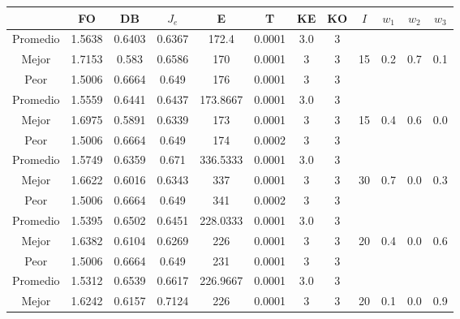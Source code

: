 \begin{table}[h!]
    \footnotesize
    \begin{center}
        \begin{tabular}{|c|c|c|c|c|c|c|c|c|c|c|c|}
        \hline
            & {\bf FO} & {\bf DB} & $J_e$ & {\bf E} & {\bf T} & {\bf KE} & {\bf KO} & $I$ & $w_1$ & $w_2$ & $w_3$ \\
        \hline
        \hline
            Promedio  & 1.5638 & 0.6403 & 0.6367 & 172.4 & 0.0001 & 3.0 & 3 &  &  &  & \\
            \cline{1-8}
            Mejor & 1.7153 & 0.583  & 0.6586 & 170 & 0.0001 & 3 & 3 & 15 & 0.2 & 0.7 & 0.1\\
            \cline{1-8}
            Peor & 1.5006 & 0.6664  & 0.649 & 176 & 0.0001 & 3 & 3 &  &  &  & \\
        \hline
        \hline
            Promedio  & 1.5559 & 0.6441 & 0.6437 & 173.8667 & 0.0001 & 3.0 & 3 &  &  &  & \\
            \cline{1-8}
            Mejor & 1.6975 & 0.5891  & 0.6339 & 173 & 0.0001 & 3 & 3 & 15 & 0.4 & 0.6 & 0.0\\
            \cline{1-8}
            Peor & 1.5006 & 0.6664  & 0.649 & 174 & 0.0002 & 3 & 3 &  &  &  & \\
        \hline
        \hline
            Promedio  & 1.5749 & 0.6359 & 0.671 & 336.5333 & 0.0001 & 3.0 & 3 &  &  &  & \\
            \cline{1-8}
            Mejor & 1.6622 & 0.6016  & 0.6343 & 337 & 0.0001 & 3 & 3 & 30 & 0.7 & 0.0 & 0.3\\
            \cline{1-8}
            Peor & 1.5006 & 0.6664  & 0.649 & 341 & 0.0002 & 3 & 3 &  &  &  & \\
        \hline
        \hline
            Promedio  & 1.5395 & 0.6502 & 0.6451 & 228.0333 & 0.0001 & 3.0 & 3 &  &  &  & \\
            \cline{1-8}
            Mejor & 1.6382 & 0.6104  & 0.6269 & 226 & 0.0001 & 3 & 3 & 20 & 0.4 & 0.0 & 0.6\\
            \cline{1-8}
            Peor & 1.5006 & 0.6664  & 0.649 & 231 & 0.0001 & 3 & 3 &  &  &  & \\
        \hline
        \hline
            Promedio  & 1.5312 & 0.6539 & 0.6617 & 226.9667 & 0.0001 & 3.0 & 3 &  &  &  & \\
            \cline{1-8}
            Mejor & 1.6242 & 0.6157  & 0.7124 & 226 & 0.0001 & 3 & 3 & 20 & 0.1 & 0.0 & 0.9\\
            \cline{1-8}

\end{tabular}
\end{center}
\end{table}
